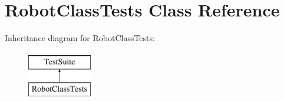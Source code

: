 \hypertarget{classRobotClassTests}{\section{Robot\-Class\-Tests Class Reference}
\label{classRobotClassTests}
}
Inheritance diagram for Robot\-Class\-Tests\-:\begin{figure}[H]
\begin{center}
\leavevmode
\includegraphics[height=2.000000cm]{classRobotClassTests}
\end{center}
\end{figure}
